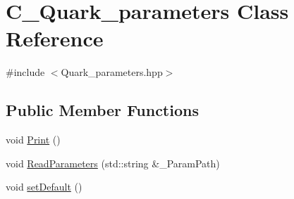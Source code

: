 \hypertarget{class_c___quark__parameters}{\section{C\-\_\-\-Quark\-\_\-parameters Class Reference}
\label{class_c___quark__parameters}
}


{\ttfamily \#include $<$Quark\-\_\-parameters.\-hpp$>$}

\subsection*{Public Member Functions}
\begin{DoxyCompactItemize}
\item 
void \hyperlink{class_c___quark__parameters_a51327f6c5d89e2ab511cf2f7e59428bc}{Print} ()
\item 
void \hyperlink{class_c___quark__parameters_a9281fabcec668955ee7a2edfb1789b6b}{Read\-Parameters} (std\-::string \&\-\_\-\-Param\-Path)
\item 
void \hyperlink{class_c___quark__parameters_aa4d30bbbbfceeff0e5eac01f979139ea}{set\-Default} ()
\end{DoxyCompactItemize}
